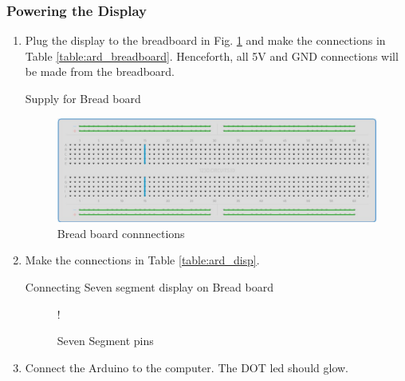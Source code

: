 \subsubsection{Powering the Display}
\begin{enumerate}[label=\arabic*.,ref=\theenumi]

\item
	Plug the display to the breadboard in Fig. \ref{fig:breadboard} and make the connections in Table \ref{table:ard_breadboard}.  Henceforth, all 5V and GND connections will be made from the breadboard.

\begin{table}[!ht]
\centering

\caption{Supply for Bread board}
\label{table:ard_breadboard}
\end{table}

\begin{figure}[!ht]
\begin{center}
\includegraphics[width=\columnwidth]{ide/sevenseg/figs/breadboard}
\end{center}
\caption{Bread board connnections}
\label{fig:breadboard}
\end{figure}


%

\item
Make the  connections in Table \ref{table:ard_disp}.  
%
\begin{table}[!ht]
\centering

\caption{Connecting Seven segment display on Bread board}
\label{table:ard_disp}
\end{table}

%
%
\begin{figure}[!ht]
\begin{center}
 {!} {

}
\end{center}
\caption{Seven Segment pins}
\label{fig:sevenseg}
\end{figure}

%
\item
	Connect the Arduino to the computer. The DOT led should glow.
\end{enumerate}
